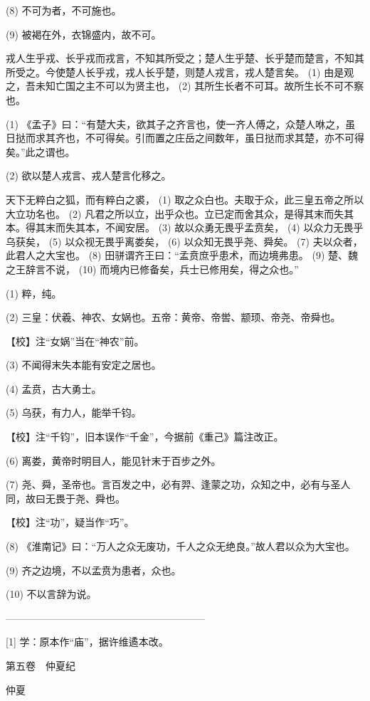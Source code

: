 \documentclass[12pt,UTF8]{ctexbook}
\begin{document}
(8) 不可为者，不可施也。

(9) 被褐在外，衣锦盛内，故不可。

戎人生乎戎、长乎戎而戎言，不知其所受之；楚人生乎楚、长乎楚而楚言，不知其所受之。今使楚人长乎戎，戎人长乎楚，则楚人戎言，戎人楚言矣。 (1) 由是观之，吾未知亡国之主不可以为贤主也， (2) 其所生长者不可耳。故所生长不可不察也。

(1) 《孟子》曰：“有楚大夫，欲其子之齐言也，使一齐人傅之，众楚人咻之，虽日挞而求其齐也，不可得矣。引而置之庄岳之间数年，虽日挞而求其楚，亦不可得矣。”此之谓也。

(2) 欲以楚人戎言、戎人楚言化移之。

天下无粹白之狐，而有粹白之裘， (1) 取之众白也。夫取于众，此三皇五帝之所以大立功名也。 (2) 凡君之所以立，出乎众也。立已定而舍其众，是得其末而失其本。得其末而失其本，不闻安居。 (3) 故以众勇无畏乎孟贲矣， (4) 以众力无畏乎乌获矣， (5) 以众视无畏乎离娄矣， (6) 以众知无畏乎尧、舜矣。 (7) 夫以众者，此君人之大宝也。 (8) 田骈谓齐王曰：“孟贲庶乎患术，而边境弗患。 (9) 楚、魏之王辞言不说， (10) 而境内已修备矣，兵士已修用矣，得之众也。”

(1) 粹，纯。

(2) 三皇：伏羲、神农、女娲也。五帝：黄帝、帝喾、颛顼、帝尧、帝舜也。

【校】注“女娲”当在“神农”前。

(3) 不闻得末失本能有安定之居也。

(4) 孟贲，古大勇士。

(5) 乌获，有力人，能举千钧。

【校】注“千钧”，旧本误作“千金”，今据前《重己》篇注改正。

(6) 离娄，黄帝时明目人，能见针末于百步之外。

(7) 尧、舜，圣帝也。言百发之中，必有羿、逢蒙之功，众知之中，必有与圣人同，故曰无畏于尧、舜也。

【校】注“功”，疑当作“巧”。

(8) 《淮南记》曰：“万人之众无废功，千人之众无绝良。”故人君以众为大宝也。

(9) 齐之边境，不以孟贲为患者，众也。

(10) 不以言辞为说。




————————————————————

[1] 学：原本作“庙”，据许维遹本改。





第五卷　仲夏纪



仲夏
\end{document}
